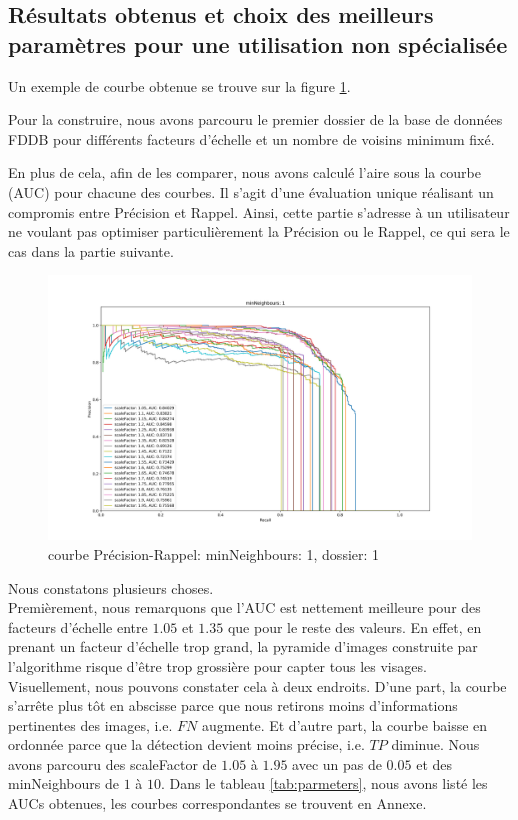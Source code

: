\documentclass[a4paper,11pt]{article}
\begin{document}
        \subsection{Résultats obtenus et choix des meilleurs paramètres pour une utilisation non spécialisée}

        Un exemple de courbe obtenue se trouve sur la figure \ref{fig:minN_1}.

        Pour la construire, nous avons parcouru le premier dossier de la base de données FDDB pour différents facteurs d'échelle et un nombre de voisins minimum fixé.

        En plus de cela, afin de les comparer, nous avons calculé l'aire sous la courbe (AUC) pour chacune des courbes. Il s'agit d'une évaluation unique réalisant un compromis entre Précision et Rappel. Ainsi, cette partie s'adresse à un utilisateur ne voulant pas optimiser particulièrement la Précision ou le Rappel, ce qui sera le cas dans la partie suivante.
        
    \label{results}
	\begin{figure}[H]
	    \begin{center}
		\includegraphics[scale = 0.4]{images/courbes/folder_01_minN_1.png}
		\caption{courbe Précision-Rappel: minNeighbours: 1, dossier: 1}
		\label{fig:minN_1}
	    \end{center}
	\end{figure}
        Nous constatons plusieurs choses.
        \\
        Premièrement, nous remarquons que l'AUC est nettement meilleure pour des facteurs d'échelle entre $1.05$ et $1.35$ que pour le reste des valeurs.
        En effet, en prenant un facteur d'échelle trop grand, la pyramide d'images construite par l'algorithme risque d'être trop grossière pour capter tous les visages.
        Visuellement, nous pouvons constater cela à deux endroits. 
        D'une part, la courbe s'arrête plus tôt en abscisse parce que nous retirons moins d'informations pertinentes des images, i.e. $FN$ augmente.
        Et d'autre part, la courbe baisse en ordonnée parce que la détection devient moins précise, i.e. $TP$ diminue.
        Nous avons parcouru des scaleFactor de $1.05$ à $1.95$ avec un pas de $0.05$ et des minNeighbours de $1$ à $10$.
        Dans le tableau \ref{tab:parmeters}, nous avons listé les AUCs obtenues, les courbes correspondantes se trouvent en Annexe.
\end{document}
